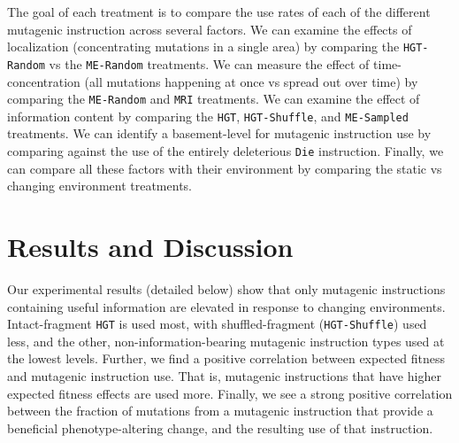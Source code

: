 \documentclass[PhD]{msu-thesis}
\begin{document}
The goal of each treatment is to compare the use rates of each of the different mutagenic instruction across several factors. We can examine the effects of localization (concentrating mutations in a single area) by comparing the \texttt{HGT-Random} vs the \texttt{ME-Random} treatments. We can measure the effect of time-concentration (all mutations happening at once vs spread out over time) by comparing the \texttt{ME-Random} and \texttt{MRI} treatments. We can examine the effect of information content by comparing the \texttt{HGT}, \texttt{HGT-Shuffle}, and \texttt{ME-Sampled} treatments. We can identify a basement-level for mutagenic instruction use by comparing against the use of the entirely deleterious \texttt{Die} instruction. Finally, we can compare all these factors with their environment by comparing the static vs changing environment treatments.

\section{Results and Discussion}
Our experimental results (detailed below) show that only mutagenic instructions containing useful information are elevated in response to changing environments. Intact-fragment \texttt{HGT} is used most, with shuffled-fragment (\texttt{HGT-Shuffle}) used less, and the other, non-information-bearing mutagenic instruction types used at the lowest levels. Further, we find a positive correlation between expected fitness and mutagenic instruction use. That is, mutagenic instructions that have higher expected fitness effects are used more. Finally, we see a strong positive correlation between the fraction of mutations from a mutagenic instruction that provide a beneficial phenotype-altering change, and the resulting use of that instruction.
\end{document}
